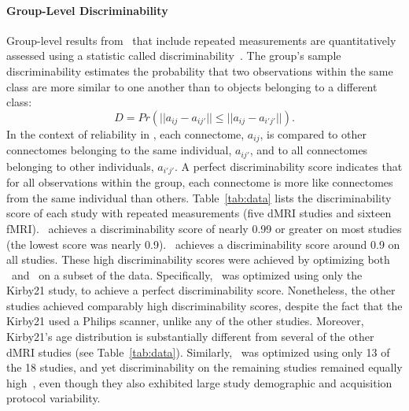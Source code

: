 \documentclass[11pt]{article}
\begin{document}
\begin{multicols}{2}



\paragraph{Group-Level Discriminability}
\label{sec:disc}

Group-level results from \ndmg~that include repeated measurements are quantitatively assessed using a statistic called discriminability~\cite{discriminability}.
The group's sample discriminability estimates the probability that two observations within the same class are more similar to one another than to objects belonging to a different class:
\begin{equation}
D = Pr(|| a_{ij} - a_{ij'} || \leq || a_{ij} - a_{i'j'} ||).
\label{eq:disc}
\end{equation}
In the context of reliability in \ndmg, each connectome, $a_{ij}$, is compared to other connectomes belonging to the same individual, $a_{ij'}$, and to all connectomes belonging to other individuals, $a_{i'j'}$.
A perfect discriminability score indicates that for all observations within the group, each connectome is more like connectomes from the same individual than others.
Table~\ref{tab:data} lists the discriminability score of each study with repeated measurements (five dMRI studies and sixteen fMRI).
 \ndmgd~achieves a discriminability score of nearly 0.99 or greater on most studies (the lowest score was nearly 0.9).  \ndmgf~achieves a discriminability score around 0.9 on all studies. 
These high discriminability scores  were achieved by optimizing both \ndmgd~and \ndmgf~on a subset of the data.  Specifically, \ndmgd~was optimized using only the Kirby21 study, to achieve a perfect discriminability score.  Nonetheless, the other studies achieved comparably high discriminability scores, despite the fact that the Kirby21 used a Philips scanner, unlike any of the other studies. Moreover, Kirby21's age distribution is substantially different from several of the other dMRI studies (see Table~\ref{tab:data}).  
Similarly, \ndmgf~was optimized using only 13 of the 18 studies, and yet discriminability on the remaining studies remained equally high~\cite{discriminability}, even though they also exhibited large study demographic and acquisition protocol variability.

\end{multicols}
\end{document}
